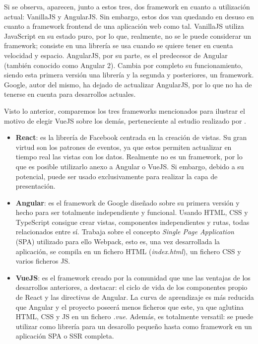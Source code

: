 Si se observa, aparecen, junto a estos tres, dos framework en cuanto a utilización actual: VanillaJS y AngularJS. Sin embargo, estos dos van quedando en desuso en cuanto a framework frontend de una aplicación web como tal. VanillaJS utiliza JavaScript en su estado puro, por lo que, realmente, no se le puede considerar un framework; consiste en una librería se usa cuando se quiere tener en cuenta velocidad y espacio. AngularJS, por su parte, es el predecesor de Angular (también conocido como Angular 2). Cambia por completo su funcionamiento, siendo esta primera versión una librería y la segunda y posteriores, un framework. Google, autor del mismo, ha dejado de actualizar AngularJS, por lo que no ha de tenerse en cuenta para desarrollos actuales.

Visto lo anterior, comparemos los tres frameworks mencionados para ilustrar el motivo de elegir VueJS sobre los demás, perteneciente al estudio realizado por .

\begin{itemize}
    \item \textbf{React}: es la librería de Facebook centrada en la creación de vistas. Su gran virtud son los patrones de eventos, ya que estos permiten actualizar en tiempo real las vistas con los datos. Realmente no es un framework, por lo que es posible utilizarlo anexo a Angular o VueJS. Si embargo, debido a su potencial, puede ser usado exclusivamente para realizar la capa de presentación.
    \item \textbf{Angular}: es el framework de Google diseñado sobre su primera versión y hecho para ser totalmente independiente y funcional. Usando HTML, CSS y TypeScript consigue crear vistas, componentes independientes y rutas, todas relacionados entre sí. Trabaja sobre el concepto \textit{Single Page Application} (SPA) utilizado para ello Webpack, esto es, una vez desarrollada la aplicación, se compila en un fichero HTML (\textit{index.html}), un fichero CSS y varios ficheros JS.
    \item \textbf{VueJS}: es el framework creado por la comunidad que une las ventajas de los desarrollos anteriores, a destacar: el ciclo de vida de los componentes propio de React y las directivas de Angular. La curva de aprendizaje es más reducida que Angular y el proyecto poseerá menos ficheros que este, ya que aglutina HTML, CSS y JS en un fichero \textit{.vue}. Además, es totalmente versatil: se puede utilizar como librería para un desarollo pequeño hasta como framework en un aplicación SPA o SSR completa.
\end{itemize}

